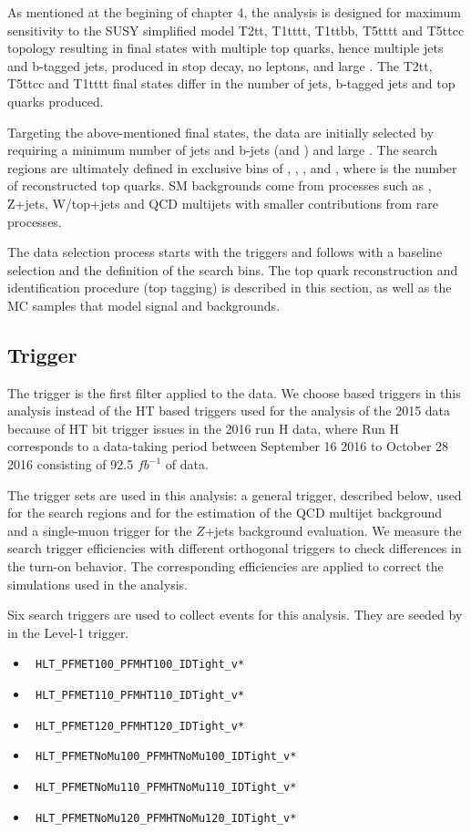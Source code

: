 As mentioned at the begining of chapter 4, the analysis is designed for maximum sensitivity to the SUSY simplified model T2tt, T1tttt, T1ttbb, T5tttt and T5ttcc topology resulting in final states with multiple top quarks, hence multiple jets and b-tagged jets, produced in stop decay, no leptons, and large \MET. The T2tt, T5ttcc and T1tttt final states differ in the number of jets, b-tagged jets and top quarks produced. 

Targeting the above-mentioned final states, the data are initially selected by requiring a minimum number of jets and b-jets (\njets and \nbjets) and large \MET. The search regions are ultimately defined in exclusive bins of \ntops, \nbjets, \HT, \MET and \MTTwo, where \ntops is the number of reconstructed top quarks. SM backgrounds come from processes such as \ttbar, Z+jets, W/top+jets and QCD multijets with smaller contributions from rare processes.

The data selection process starts with the triggers and follows with a baseline selection and the definition of the search bins. The top quark reconstruction and identification procedure (top tagging) is described in this section, as well as the MC samples that model signal and backgrounds.

\subsection{Trigger}
\label{sec:trig}

The trigger is the first filter applied to the data. We choose \MET based triggers in this analysis instead of the HT based triggers used for the analysis of the 2015 data because of HT bit trigger issues in the 2016 run H data, where Run H corresponds to a data-taking period between September 16 2016 to October 28 2016 consisting of 92.5 $fb^{-1}$ of data. 

The trigger sets are used in this analysis: a general trigger, described below, used for the search regions and for the estimation of the QCD multijet background and a single-muon trigger for the $Z$+jets background evaluation. We measure the search trigger efficiencies with different orthogonal triggers to check differences in the turn-on behavior. The corresponding efficiencies are applied to correct the simulations used in the analysis.

Six search triggers are used to collect events for this analysis. They are seeded by \MET in the Level-1 trigger. 
\begin{itemize}
\item \texttt{ HLT\_PFMET100\_PFMHT100\_IDTight\_v*}
\item \texttt{ HLT\_PFMET110\_PFMHT110\_IDTight\_v*}
\item \texttt{ HLT\_PFMET120\_PFMHT120\_IDTight\_v*}
\item \texttt{ HLT\_PFMETNoMu100\_PFMHTNoMu100\_IDTight\_v*} 
\item \texttt{ HLT\_PFMETNoMu110\_PFMHTNoMu110\_IDTight\_v* }
\item \texttt{ HLT\_PFMETNoMu120\_PFMHTNoMu120\_IDTight\_v*}
\end{itemize}

